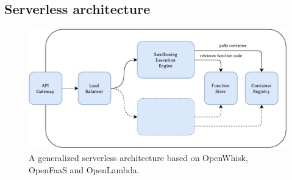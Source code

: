\subsection{Serverless architecture}

\begin{figure}
    \includegraphics[width=\textwidth]{figures/ServerlessArchitecture.pdf}
    \caption{A generalized serverless architecture based on OpenWhisk, OpenFaaS and OpenLambda.}
    \label{fig:serverless-architecture}
\end{figure}

